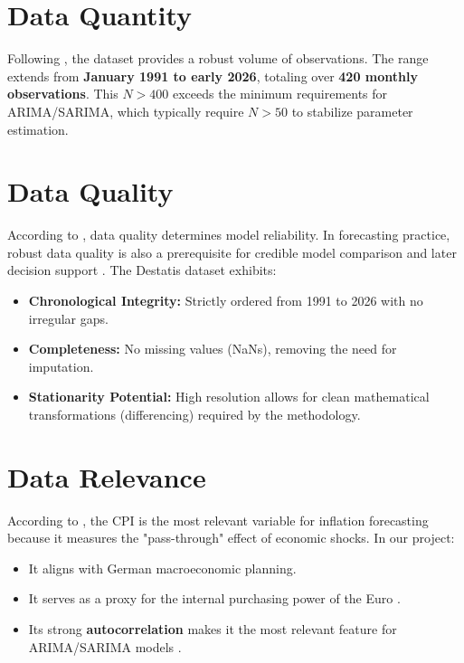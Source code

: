 \section{Data Quantity}

Following \cite{Box2015}, the dataset provides a robust volume of observations. The range extends from \textbf{January 1991 to early 2026}, totaling over \textbf{420 monthly observations}. This $N > 400$ exceeds the minimum requirements for ARIMA/SARIMA, which typically require $N > 50$ to stabilize parameter estimation.

\section{Data Quality}

According to \cite{Brownlee2017}, data quality determines model reliability. In forecasting practice, robust data quality is also a prerequisite for credible model comparison and later decision support \cite{Chase:2013,Armstrong:2001}. The Destatis dataset exhibits:
\begin{itemize}
	\item \textbf{Chronological Integrity:} Strictly ordered from 1991 to 2026 with no irregular gaps.
	\item \textbf{Completeness:} No missing values (NaNs), removing the need for imputation.
	\item \textbf{Stationarity Potential:} High resolution allows for clean mathematical transformations (differencing) required by the \cite{Box2015} methodology.
\end{itemize}

\section{Data Relevance}

According to \cite{StockWatson1999}, the CPI is the most relevant variable for inflation forecasting because it measures the "pass-through" effect of economic shocks. In our project:
\begin{itemize}
	\item It aligns with German macroeconomic planning.
	\item It serves as a proxy for the internal purchasing power of the Euro \cite{Wilmott:2007}.
	\item Its strong \textbf{autocorrelation} makes it the most relevant feature for ARIMA/SARIMA models \cite{Hastie2009}.
\end{itemize}


